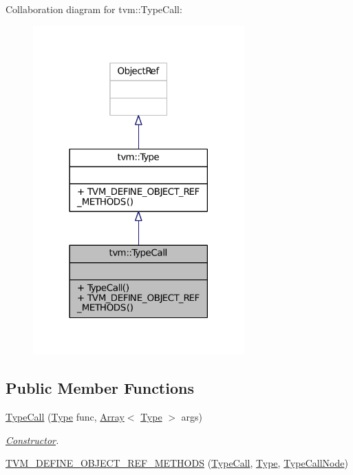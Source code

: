 Collaboration diagram for tvm\+:\+:Type\+Call\+:
\nopagebreak
\begin{figure}[H]
\begin{center}
\leavevmode
\includegraphics[width=230pt]{classtvm_1_1TypeCall__coll__graph}
\end{center}
\end{figure}
\subsection*{Public Member Functions}
\begin{DoxyCompactItemize}
\item 
\hyperlink{classtvm_1_1TypeCall_a54ca5beebff2a428241cf7564b496e02}{Type\+Call} (\hyperlink{classtvm_1_1Type}{Type} func, \hyperlink{classtvm_1_1Array}{Array}$<$ \hyperlink{classtvm_1_1Type}{Type} $>$ args)
\begin{DoxyCompactList}\small\item\em \hyperlink{classtvm_1_1Constructor}{Constructor}. \end{DoxyCompactList}\item 
\hyperlink{classtvm_1_1TypeCall_aff9a2729e1e49a8ac2a27304d42825d2}{T\+V\+M\+\_\+\+D\+E\+F\+I\+N\+E\+\_\+\+O\+B\+J\+E\+C\+T\+\_\+\+R\+E\+F\+\_\+\+M\+E\+T\+H\+O\+DS} (\hyperlink{classtvm_1_1TypeCall}{Type\+Call}, \hyperlink{classtvm_1_1Type}{Type}, \hyperlink{classtvm_1_1TypeCallNode}{Type\+Call\+Node})
\end{DoxyCompactItemize}


